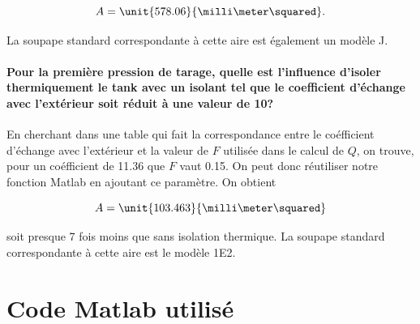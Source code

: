 $$A = \unit{578.06}{\milli\meter\squared}.$$

La soupape standard correspondante à cette aire est également
un modèle J\cite{mignon}.

\paragraph{Pour la première pression de tarage, quelle est l'influence
d'isoler thermiquement le tank avec un isolant tel que le coefficient
d'échange avec l'extérieur soit réduit à une valeur de
\unit{10}{\watt\per\meter\squared\kelvin}?}
En cherchant dans une table qui fait la correspondance 
entre le coéfficient d'échange avec l'extérieur et la valeur
de $F$ utilisée dans le calcul de $Q$, on trouve, pour un
coéfficient de 11.36 que $F$ vaut 0.15. On peut donc
réutiliser notre fonction Matlab en ajoutant ce paramètre.
On obtient 

$$A = \unit{103.463}{\milli\meter\squared}$$

soit presque 7 fois moins que sans isolation thermique.
La soupape standard correspondante à cette aire est le modèle
1E2.

\appendix
\section{Code Matlab utilisé}
\label{code-matlab}

